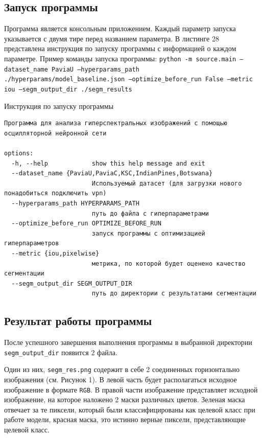 \documentclass[14pt, russian]{scrartcl}
\begin{document}
\subsection{Запуск программы}\label{subsect::program_run}

Программа является консольным приложением. Каждый параметр запуска указывается с двумя тире перед названием параметра. В листинге 28 представлена инструкция по запуску 
программы с информацией о каждом параметре. Пример команды запуска программы: \texttt{python -m source.main --dataset\_name PaviaU --hyperparams\_path ./hyperparams/model\_baseline.json --optimize\_before\_run False --metric iou --segm\_output\_dir ./segm\_results}
\begin{listing}[H]
    \caption{Инструкция по запуску программы}
    \label{lst:contour_extr_sobel}
    \begin{verbatim}
Программа для анализа гиперспектральных изображений с помощью осцилляторной нейронной сети

options:
  -h, --help            show this help message and exit
  --dataset_name {PaviaU,PaviaC,KSC,IndianPines,Botswana}
                        Используемый датасет (для загрузки нового понадобиться подключить vpn)
  --hyperparams_path HYPERPARAMS_PATH
                        путь до файла с гиперпараметрами
  --optimize_before_run OPTIMIZE_BEFORE_RUN
                        запуск программы с оптимизацией гиперпараметров
  --metric {iou,pixelwise}
                        метрика, по которой будет оценено качество сегментации
  --segm_output_dir SEGM_OUTPUT_DIR
                        путь до директории с результатами сегментации
    \end{verbatim}
\end{listing}

\subsection{Результат работы программы}\label{subsect::program_results}

После успешного завершения выполнения программы в выбранной директории \texttt{segm\_output\_dir} появится 2 файла. 

Один из них, \texttt{segm\_res.png} содержит в себе 2 соединенных горизонтально изображения (см. Рисунок 1). В левой часть будет располагаться исходное изображение в формате \texttt{RGB}. В правой части изображение представляет 
исходной изображение, на которое наложено 2 маски различных цветов. Зеленая маска отвечает за те пиксели, который были классифицированы как целевой класс при работе модели, 
красная маска, это истинно верные пиксели, представляющие целевой класс. 
\end{document}
